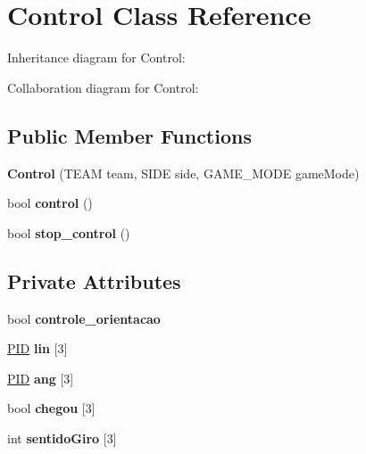 \hypertarget{classControl}{}\section{Control Class Reference}
\label{classControl}


Inheritance diagram for Control\+:


Collaboration diagram for Control\+:
\subsection*{Public Member Functions}
\begin{DoxyCompactItemize}
\item 
{\bfseries Control} (T\+E\+AM team, S\+I\+DE side, G\+A\+M\+E\+\_\+\+M\+O\+DE game\+Mode)\hypertarget{classControl_a7f382d2f3855b71eecc555151101958c}{}\label{classControl_a7f382d2f3855b71eecc555151101958c}

\item 
bool {\bfseries control} ()\hypertarget{classControl_a563e0c350a0794cb9560a15319a16491}{}\label{classControl_a563e0c350a0794cb9560a15319a16491}

\item 
bool {\bfseries stop\+\_\+control} ()\hypertarget{classControl_a4284f3b0c86ccbced1e1de124051d7ed}{}\label{classControl_a4284f3b0c86ccbced1e1de124051d7ed}

\end{DoxyCompactItemize}
\subsection*{Private Attributes}
\begin{DoxyCompactItemize}
\item 
bool {\bfseries controle\+\_\+orientacao}\hypertarget{classControl_a32e5f1189c925b0c79329ed5a60b8a02}{}\label{classControl_a32e5f1189c925b0c79329ed5a60b8a02}

\item 
\hyperlink{classPID}{P\+ID} {\bfseries lin} \mbox{[}3\mbox{]}\hypertarget{classControl_a74f59f252e41edbe7e3d89b28ec5f9e3}{}\label{classControl_a74f59f252e41edbe7e3d89b28ec5f9e3}

\item 
\hyperlink{classPID}{P\+ID} {\bfseries ang} \mbox{[}3\mbox{]}\hypertarget{classControl_a2d6907c17518d36c4e7677f89275801d}{}\label{classControl_a2d6907c17518d36c4e7677f89275801d}

\item 
bool {\bfseries chegou} \mbox{[}3\mbox{]}\hypertarget{classControl_a5b552372e9b50394995b84ee8dbf866f}{}\label{classControl_a5b552372e9b50394995b84ee8dbf866f}

\item 
int {\bfseries sentido\+Giro} \mbox{[}3\mbox{]}\hypertarget{classControl_a54017269ee35988c7fe36b95b8d8dc0c}{}\label{classControl_a54017269ee35988c7fe36b95b8d8dc0c}

\end{DoxyCompactItemize}
